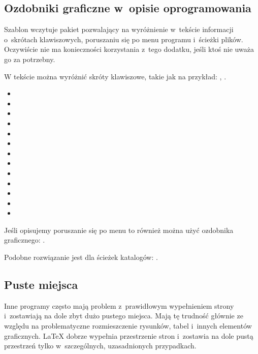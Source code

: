 \subsection{Ozdobniki graficzne w~opisie oprogramowania}
Szablon wczytuje pakiet pozwalający na wyróżnienie w~tekście informacji o~skrótach klawiszowych, poruszaniu się po menu
programu i~ścieżki plików. Oczywiście nie ma konieczności korzystania z~tego dodatku, jeśli ktoś nie uważa go za
potrzebny.

W tekście można wyróżnić skróty klawiszowe, takie jak na przykład: , \keys{\ctrl, \Alt, \del}.
\begin{itemize}
    \item {}
    \item \keys{\Space} \keys{\SPACE}
    \item \keys{\backspace} \keys{\del} \keys{\backdel}
    \item \keys{\return} \keys{\enter}
    \item \keys{\shift} \keys{\capslock}
    \item \keys{\ctrl} \keys{\Alt} \keys{\AltGr}
    \item \keys{\tab}
    \item \keys{\esc} \keys{\oldesc}
    \item \keys{\winmenu}
    \item \keys{\arrowkey{^}} \keys{\arrowkeyup}
    \item {} \keys{\arrowkeydown}
    \item \keys{\arrowkey{>}} \keys{\arrowkeyright}
    \item \keys{\arrowkey{<}} \keys{\arrowkeyleft}
\end{itemize}

Jeśli opisujemy poruszanie się po menu to również można użyć ozdobnika graficznego: .

Podobne rozwiązanie jest dla ścieżek katalogów: .

\subsection{Puste miejsca}
Inne programy często mają problem z~prawidłowym wypełnieniem strony i~zostawiają na dole zbyt dużo pustego miejsca. Mają
tę trudność głównie ze względu na problematyczne rozmieszczenie rysunków, tabel i~innych elementów graficznych. \LaTeX{}
dobrze wypełnia przestrzenie stron i~zostawia na dole pustą przestrzeń tylko w~szczególnych, uzasadnionych przypadkach.

